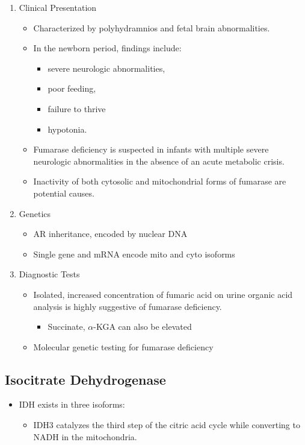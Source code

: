 \documentclass{scrartcl}
\begin{document}
\begin{enumerate}
\item Clinical Presentation
\label{sec:org9bf78e8}
\begin{itemize}
\item Characterized by polyhydramnios and fetal brain abnormalities.
\item In the newborn period, findings include:
\begin{itemize}
\item severe neurologic abnormalities,
\item poor feeding,
\item failure to thrive
\item hypotonia.
\end{itemize}
\item Fumarase deficiency is suspected in infants with multiple severe
neurologic abnormalities in the absence of an acute metabolic
crisis.
\item Inactivity of both cytosolic and mitochondrial forms of
fumarase are potential causes.
\end{itemize}
\item Genetics
\label{sec:org1ebd4d0}
\begin{itemize}
\item AR inheritance, encoded by nuclear DNA
\item Single gene and mRNA encode mito and cyto isoforms
\end{itemize}
\item Diagnostic Tests
\label{sec:orgb7380a3}
\begin{itemize}
\item Isolated, increased concentration of fumaric acid on urine organic
acid analysis is highly suggestive of fumarase deficiency.
\begin{itemize}
\item Succinate, \(\alpha\)-KGA can also be elevated
\end{itemize}
\item Molecular genetic testing for fumarase deficiency
\end{itemize}
\end{enumerate}
\subsection{Isocitrate Dehydrogenase}
\label{sec:org2e65cae}
\begin{itemize}
\item IDH exists in three isoforms:
\begin{itemize}
\item IDH3 catalyzes the third step of the citric acid cycle while converting  to NADH in the mitochondria.
\end{itemize}
\end{itemize}
\end{document}
